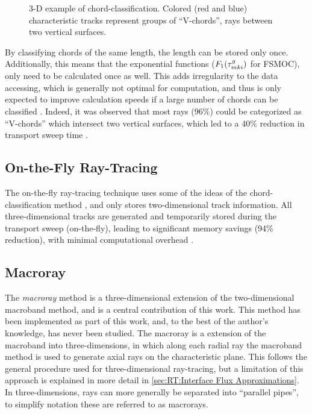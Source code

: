 {{{            \begin{figure}[h]
                \centering
                \def\svgwidth{0.45\linewidth}
                
                \caption{3-D example of chord-classification. Colored (red and blue) characteristic tracks represent groups of ``V-chords'', rays between two vertical surfaces.}
                \label{fig:RT:Chord-Classification}
            \end{figure}

            By classifying chords of the same length, the length can be stored only once.
            Additionally, this means that the exponential functions ($F_1(\segopt)$ for \ac{FSMOC}), only need to be calculated once as well.
            This adds irregularity to the data accessing, which is generally not optimal for computation, and thus is only expected to improve calculation speeds if a large number of chords can be classified \cite{Sciannandrone2016}.
            Indeed, it was observed that most rays (96\%) could be categorized as ``V-chords'' which intersect two vertical surfaces, which led to a 40\% reduction in transport sweep time \cite{Sciannandrone2016}.
        }
        \subsection{On-the-Fly Ray-Tracing}{\label{ssec:RT:On-the-Fly Ray-Tracing}
            The on-the-fly ray-tracing technique \cite{Gunow2016} uses some of the ideas of the chord-classification method \cite{Sciannandrone2016}, and only stores two-dimensional track information.
            All three-dimensional tracks are generated and temporarily stored during the transport sweep (on-the-fly), leading to significant memory savings (94\% reduction), with minimal computational overhead \cite{Gunow2016}.
        }
        \subsection{Macroray}{\label{ssec:RT:Macroray}
            The \emph{macroray} method is a three-dimensional extension of the two-dimensional macroband method, and is a central contribution of this work.
            This method has been implemented as part of this work, and, to the best of the author's knowledge, has never been studied.
            The macroray is a extension of the macroband into three-dimensions, in which along each radial ray the macroband method is used to generate axial rays on the characteristic plane.
            This follows the general procedure used for three-dimensional ray-tracing, but a limitation of this approach is explained in more detail in \cref{sec:RT:Interface Flux Approximations}.
            In three-dimensions, rays can more generally be separated into ``parallel pipes'', to simplify notation these are referred to as macrorays.

}}}

